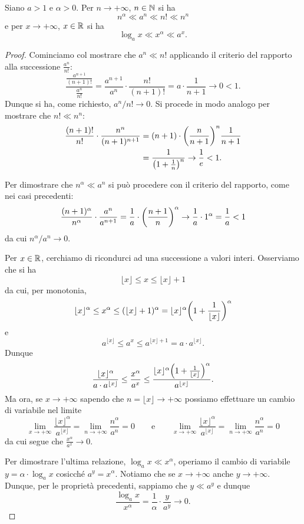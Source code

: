 \begin{theorem}
\label{th:ordine_infinito}%
%
%
\mymark{***}%
Siano $a>1$ e $\alpha>0$. Per $n\to +\infty$, $n\in{\mathbb N}$
si ha
\[
  n^\alpha \ll a^n \ll n! \ll n^n
\]
e per $x\to +\infty$, $x\in {\mathbb R}$ si ha 
\[
\log_a x \ll x^\alpha \ll a^x.
\]
\end{theorem}
%
\begin{proof}
\mymark{**}
Cominciamo col mostrare che $a^n \ll n!$
applicando il criterio del rapporto alla successione $\frac{a^n}{n!}$:
\[
\frac{\displaystyle \frac{a^{n+1}}{(n+1)!}}{\displaystyle \frac{a^n}{n!}}
= \frac{a^{n+1}}{a^n}\cdot \frac{n!}{(n+1)!}
= a \cdot \frac {1}{n + 1} \to 0 < 1.
\]
Dunque si ha, come richiesto, $a^n / n! \to 0$.
Si procede in modo analogo per mostrare che $n! \ll n^n$:
\begin{align*}
\frac{(n+1)!}{n!}\cdot \frac{n^n}{(n+1)^{n+1}}
&= (n+1) \cdot {\left( \frac{n}{n+1} \right)}^n \frac {1}{n+1}\\
&= \frac{1}{{\left( 1+\frac 1 n \right)}^n} \to \frac 1 e < 1.
\end{align*}
  
Per dimostrare che
$n^\alpha \ll a^n$
si può procedere con il criterio del rapporto, come nei casi precedenti:
\[
\frac{(n+1)^\alpha}{n^\alpha}\cdot \frac{a^n}{a^{n+1}}
= \frac 1 a \cdot {\left( \frac{n+1}{n} \right)}^\alpha \to \frac 1 a \cdot 1^\alpha = \frac 1 a < 1
\]
da cui $n^\alpha / a^n \to 0$.

Per $x\in {\mathbb R}$,
cerchiamo di ricondurci ad una successione a valori interi.
Osserviamo che si ha
\[
\lfloor x \rfloor
\le x
\le \lfloor x \rfloor + 1
\]
da cui, per monotonia,
\[
\lfloor x \rfloor^\alpha
\le x^\alpha
\le (\lfloor x \rfloor + 1)^\alpha
= \lfloor x \rfloor^\alpha {\left( 1+ \frac{1}{\lfloor x \rfloor} \right)}^\alpha
\]
e
\[
a^{\lfloor x \rfloor}
\le a^{x}
\le a^{\lfloor x \rfloor + 1}
= a \cdot a^{\lfloor x \rfloor}.
\]
Dunque
\[
\frac{\lfloor x \rfloor^\alpha}{a \cdot a^{\lfloor x \rfloor}}
\le \frac{x^\alpha}{a^{x}}
\le \frac{\lfloor x \rfloor^\alpha {\left( 1+ \frac{1}{\lfloor x \rfloor} \right)}^\alpha}
    {a^{\lfloor x \rfloor}}.
\]
Ma ora, se $x\to +\infty$ sapendo che $n = \lfloor x\rfloor \to +\infty$ 
possiamo effettuare un cambio di variabile nel limite
\[
\lim_{x\to +\infty} \frac{\lfloor x \rfloor^\alpha}{a^{\lfloor x \rfloor}} 
= \lim_{n\to+\infty} \frac{n^\alpha}{a^n} = 0
\qquad
\text{e}
\qquad
\lim_{x\to+\infty} \frac{\lfloor x \rfloor^\alpha }
    {a^{\lfloor x \rfloor}} 
= \lim_{n\to+\infty} \frac{n^\alpha}{a^n} = 0
\]
da cui segue che $\frac{x^\alpha}{a^{x}}\to 0$.

Per dimostrare l'ultima relazione, $\log_a x\ll x^\alpha$,
operiamo il cambio di variabile $y = \alpha \cdot \log_a x$
cosicché $a^y = x^\alpha$.
Notiamo che se $x\to +\infty$
anche $y \to +\infty$.
Dunque, per le proprietà precedenti,
sappiamo che $y \ll a^y$ e dunque
\[
\frac{\log_a x}{x^\alpha}
= \frac{1}{\alpha}\cdot\frac{y}{a^{y}} \to 0.
\]
\end{proof}

